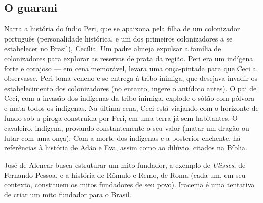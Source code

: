 \documentclass[12pt]{book}
\begin{document}
				\subsection{O guarani}
				\par Narra a história do índio Peri, que se apaixona pela filha de um colonizador português (personalidade histórica, e um dos primeiros colonizadores a se estabelecer no Brasil), Cecília. Um padre almeja expulsar a família de colonizadores para explorar as reservas de prata da região. Peri era um indígena forte e corajoso — em cena memorável, levara uma onça-pintada para que Ceci a observasse. Peri toma veneno e se entrega à tribo inimiga, que desejava invadir os estabelecimento dos colonizadores (no entanto, ingere o antídoto antes). O pai de Ceci, com a invasão dos indígenas da tribo inimiga, explode o sótão com pólvora e mata todos os indígenas. Na última cena, Ceci está viajando com o horizonte de fundo sob a piroga construída por Peri, em uma terra já sem habitantes. O cavaleiro, indígena, provando constantemente o seu valor (matar um dragão ou lutar com uma onça). Com a morte dos indígenas e a posterior enchente, há referências à história de Adão e Eva, assim como ao dilúvio, citados na Bíblia.
				\par José de Alencar busca estruturar um mito fundador, a exemplo de \textit{Ulisses}, de Fernando Pessoa, e a história de Rômulo e Remo, de Roma (cada um, em seu contexto, constituem os mitos fundadores de seu povo). Iracema é uma tentativa de criar um mito fundador para o Brasil.
\end{document}
